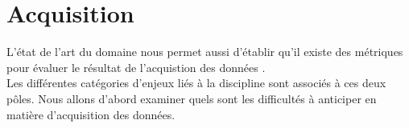 \section{Acquisition}

L'état de l'art du domaine nous permet aussi d'établir qu'il existe des métriques pour évaluer le résultat de l'acquistion des données \cite{giotWeb}.\\
Les différentes catégories d'enjeux liés à la discipline sont associés à ces deux pôles. Nous allons d'abord examiner quels sont les difficultés à anticiper en matière d'acquisition des données.



